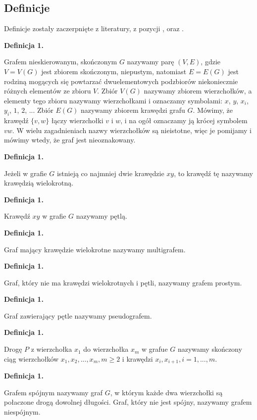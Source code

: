 \subsection{Definicje}
Definicje zostały zaczerpnięte z literatury, z pozycji \cite{Wloch2008}, \cite{Wilson2012} oraz \cite{Wojciechwoski2013}.

\newcommand{\graphDefinitionIndex}{1}
\newcommand{\incrementGraphDefinitionIndex} {
    \pgfmathtruncatemacro{\graphDefinitionIndex}{\graphDefinitionIndex + 1}
}

\noindent
\textbf{Definicja \graphDefinitionIndex.}
\incrementGraphDefinitionIndex
Grafem nieskierowanym, skończonym $G$ nazywamy parę $(V,E)$, gdzie $V = V(G)$ jest zbiorem skończonym, niepustym,
natomiast $E = E(G)$ jest rodziną mogących się powtarzać dwuelementowych podzbiorów niekoniecznie różnych elementów ze zbioru $V$.
Zbiór $V(G)$ nazywamy zbiorem wierzchołków, a elementy tego zbioru nazywamy wierzchołkami i oznaczamy symbolami:
$x$, $y$, $x_i$, $y_i$, $1$, $2$, ... Zbiór $E(G)$ nazywamy zbiorem krawędzi grafu $G$.
Mówimy, że krawędź $\{v, w\}$ łączy wierzchołki $v$ i $w$, i na ogół oznaczamy ją krócej symbolem $vw$.
W wielu zagadnieniach nazwy wierzchołków są nieistotne, więc je pomijamy i mówimy wtedy, że graf jest nieoznakowany.

\noindent
\textbf{Definicja \graphDefinitionIndex.}
\incrementGraphDefinitionIndex
Jeżeli w grafie $G$ istnieją co najmniej dwie krawędzie $xy$, to krawędź tę nazywamy krawędzią wielokrotną.

\noindent
\textbf{Definicja \graphDefinitionIndex.}
\incrementGraphDefinitionIndex
Krawędź $xy$ w grafie $G$ nazywamy pętlą.

\noindent
\textbf{Definicja \graphDefinitionIndex.}
\incrementGraphDefinitionIndex
Graf mający krawędzie wielokrotne nazywamy multigrafem.

\noindent
\textbf{Definicja \graphDefinitionIndex.}
\incrementGraphDefinitionIndex
Graf, który nie ma krawędzi wielokrotnych i pętli, nazywamy grafem prostym.

\noindent
\textbf{Definicja \graphDefinitionIndex.}
\incrementGraphDefinitionIndex
Graf zawierający pętle nazywamy pseudografem.

\noindent
\textbf{Definicja \graphDefinitionIndex.}
\incrementGraphDefinitionIndex
Drogę $P$ z wierzchołka $x_1$ do wierzchołka $x_m$ w grafue $G$ nazywamy skończony ciąg wierzchołków
$x_1, x_2, ..., x_m, m \geqslant 2$ i krawędzi ${x_i, x_{i + 1}}, i = 1, ..., m$.

\noindent
\textbf{Definicja \graphDefinitionIndex.}
\incrementGraphDefinitionIndex
Grafem spójnym nazywamy graf $G$, w którym każde dwa wierzchołki są połaczone drogą dowolnej długości.
Graf, który nie jest spójny, nazywamy grafem niespójnym.


